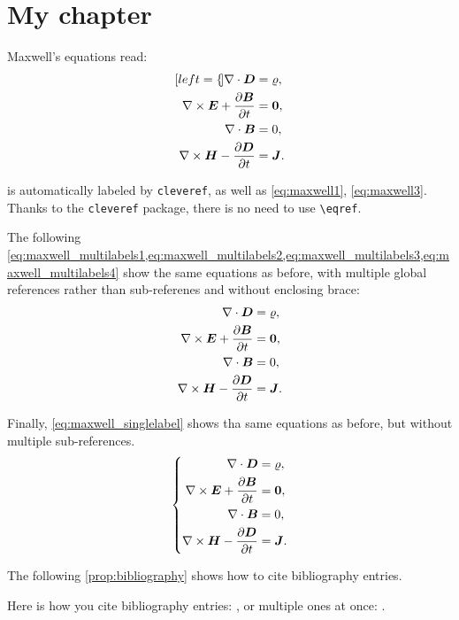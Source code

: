 
\chapter{My chapter}
\label{ch:chapter_name}

Maxwell's equations read:
\begin{subequations}
    \label{eq:maxwell}
    \begin{align}[left=\empheqlbrace]
    \nabla\cdot \bm{D} & = \varrho, \label{eq:maxwell1} \\
    \nabla \times \bm{E} +  \pdev{\bm{B}}{t} &= \bm{0}, \label{eq:maxwell2} \\
    \nabla\cdot \bm{B} & = 0, \label{eq:maxwell3} \\
    \nabla \times \bm{H} - \pdev{\bm{D}}{t} &= \bm{J}. \label{eq:maxwell4}
    \end{align}
\end{subequations}

 is automatically labeled by \texttt{cleveref}, as well as \cref{eq:maxwell1}, \cref{eq:maxwell3}. Thanks to the \verb|cleveref| package, there is no need to use \verb|\eqref|.

The following \cref{eq:maxwell_multilabels1,eq:maxwell_multilabels2,eq:maxwell_multilabels3,eq:maxwell_multilabels4} show the same equations as before, with multiple global references rather than sub-referenes and without enclosing brace:
\begin{align}
    \nabla\cdot \bm{D} & = \varrho, \label{eq:maxwell_multilabels1} \\
    \nabla \times \bm{E} +  \frac{\partial\bm{B}}{\partial t} &= \bm{0}, \label{eq:maxwell_multilabels2} \\
    \nabla\cdot \bm{B} & = 0, \label{eq:maxwell_multilabels3} \\
    \nabla \times \bm{H} - \frac{\partial\bm{D}}{\partial t} &= \bm{J} \label{eq:maxwell_multilabels4}.
\end{align}

Finally, \cref{eq:maxwell_singlelabel} shows tha same equations as before, but without multiple sub-references.
\begin{equation}
    \label{eq:maxwell_singlelabel}
    \left\{
    \begin{aligned}
    \nabla\cdot \bm{D} & = \varrho, \\
    \nabla \times \bm{E} +  \frac{\partial\bm{B}}{\partial t} &= \bm{0},\\
    \nabla\cdot \bm{B} & = 0, \\
    \nabla \times \bm{H} - \frac{\partial\bm{D}}{\partial t} &= \bm{J}.
    \end{aligned}
    \right.
\end{equation}

\vspace{\baselineskip}

The following \cref{prop:bibliography} shows how to cite bibliography entries.

\begin{proposition}[Bibliography]
\label{prop:bibliography}
    Here is how you cite bibliography entries: \cite{knuth74}, or multiple ones at once: \cite{knuth92,lamport94}.
\end{proposition}
